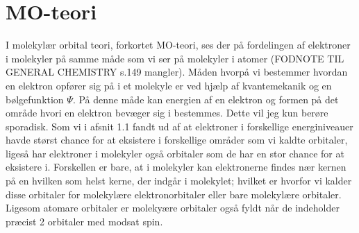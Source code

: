 \section{MO-teori}
I molekylær orbital teori, forkortet MO-teori, ses der på fordelingen af elektroner i molekyler på samme måde som vi ser på molekyler i atomer (FODNOTE TIL GENERAL CHEMISTRY s.149 mangler). Måden hvorpå vi bestemmer hvordan en elektron opfører sig på i et molekyle er ved hjælp af kvantemekanik og en bølgefunktion $\Psi$. På denne måde kan energien af en elektron og formen på det område hvori en elektron bevæger sig i bestemmes. Dette vil jeg kun berøre sporadisk. Som vi i afsnit 1.1 fandt ud af at elektroner i forskellige energiniveauer havde størst chance for at eksistere i forskellige områder som vi kaldte orbitaler, ligeså har elektroner i molekyler også orbitaler som de har en stor chance for at eksistere i. Forskellen er bare, at i molekyler kan elektronerne findes nær kernen på en hvilken som helst kerne, der indgår i molekylet; hvilket er hvorfor vi kalder disse orbitaler for molekylære elektronorbitaler eller bare molekylære orbitaler. 
Ligesom atomare orbitaler er molekyære orbitaler også fyldt når de indeholder præcist 2 orbitaler med modsat spin. 
